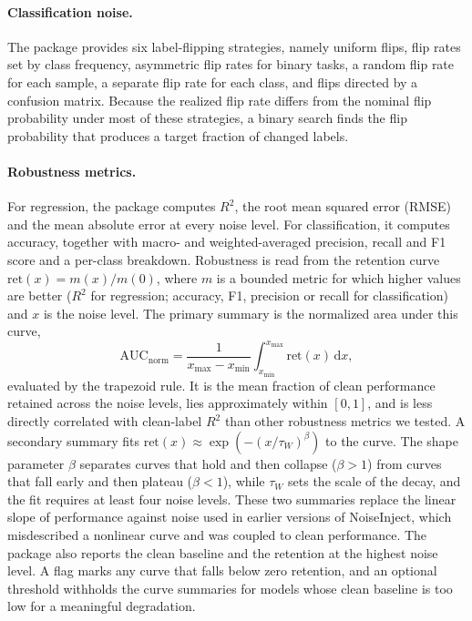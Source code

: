 \paragraph{Classification noise.} The package provides six label-flipping strategies, namely uniform flips,
flip rates set by class frequency, asymmetric flip rates for binary tasks, a random flip rate for each sample,
a separate flip rate for each class, and flips directed by a confusion matrix. Because the realized
flip rate differs from the nominal flip probability under most of these strategies, a binary search
finds the flip probability that produces a target fraction of changed labels.

\paragraph{Robustness metrics.} For regression, the package computes $R^2$, the root mean squared error (RMSE) and the mean absolute
error at every noise level. For classification, it computes accuracy, together with macro- and weighted-averaged precision, recall and F1
score and a per-class breakdown. Robustness is read from the
retention curve $\mathrm{ret}(x) = m(x)/m(0)$, where $m$ is a bounded metric for which higher values are better
($R^2$ for regression; accuracy, F1, precision or recall for classification) and $x$ is the noise
level. The primary summary is the normalized area under this curve,
\begin{equation}
\mathrm{AUC}_{\mathrm{norm}} = \frac{1}{x_{\max} - x_{\min}} \int_{x_{\min}}^{x_{\max}} \mathrm{ret}(x)\,\mathrm{d}x,
\label{eq:auc_norm}
\end{equation}
evaluated by the trapezoid rule. It is the mean fraction of clean performance retained across the
noise levels, lies approximately within $[0, 1]$, and is less directly correlated with clean-label $R^2$ than other robustness metrics we tested. A
secondary summary fits $\mathrm{ret}(x) \approx \exp\!\left(-(x/\tau_W)^{\beta}\right)$ to the curve. The shape parameter
$\beta$ separates curves that hold and then collapse ($\beta > 1$) from curves that fall early and
then plateau ($\beta < 1$), while $\tau_W$ sets the scale of the decay, and the fit requires at least four
noise levels. These two summaries replace the linear slope of performance against noise used in
earlier versions of NoiseInject, which misdescribed a nonlinear curve and was coupled to clean performance. The
package also reports the clean baseline and the retention at the highest noise level. A flag marks any
curve that falls below zero retention, and an optional threshold withholds the curve summaries for
models whose clean baseline is too low for a meaningful degradation.

